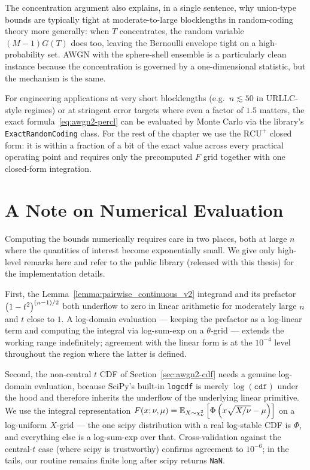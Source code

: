 The concentration argument also explains, in a single sentence, why union-type bounds are typically tight at moderate-to-large blocklengths in random-coding theory more generally: when $T$ concentrates, the random variable $(M-1) G(T)$ does too, leaving the Bernoulli envelope tight on a high-probability set.  AWGN with the sphere-shell ensemble is a particularly clean instance because the concentration is governed by a one-dimensional statistic, but the mechanism is the same.

For engineering applications at very short blocklengths (e.g.\ $n \lesssim 50$ in URLLC-style regimes) or at stringent error targets where even a factor of $1.5$ matters, the exact formula~\eqref{eq:awgn2-percl} can be evaluated by Monte Carlo via the library's \texttt{ExactRandomCoding} class.  For the rest of the chapter we use the $\mathrm{RCU}^+$ closed form: it is within a fraction of a bit of the exact value across every practical operating point and requires only the precomputed $F$ grid together with one closed-form integration.

\section{A Note on Numerical Evaluation}
\label{sec:awgn2-numerics}

Computing the bounds numerically requires care in two places, both at large $n$ where the quantities of interest become exponentially small.  We give only high-level remarks here and refer to the public library (released with this thesis) for the implementation details.

First, the Lemma~\ref{lemma:pairwise_continuous_v2} integrand and its prefactor $\left( 1-t^2 \right)^{(n-1)/2}$ both underflow to zero in linear arithmetic for moderately large $n$ and $t$ close to $1$.  A log-domain evaluation --- keeping the prefactor as a log-linear term and computing the integral via log-sum-exp on a $\theta$-grid --- extends the working range indefinitely; agreement with the linear form is at the $10^{-4}$ level throughout the region where the latter is defined.

Second, the non-central $t$ CDF of Section~\ref{sec:awgn2-cdf} needs a genuine log-domain evaluation, because SciPy's built-in \texttt{logcdf} is merely $\log(\texttt{cdf})$ under the hood and therefore inherits the underflow of the underlying linear primitive.  We use the integral representation $F(x; \nu, \mu) = \mathbb{E}_{X\sim\chi^2_\nu} \left[ \Phi\left( x\sqrt{X/\nu} - \mu \right) \right]$ on a log-uniform $X$-grid --- the one scipy distribution with a real log-stable CDF is $\Phi$, and everything else is a log-sum-exp over that.  Cross-validation against the central-$t$ case (where scipy is trustworthy) confirms agreement to $10^{-6}$; in the tails, our routine remains finite long after scipy returns \texttt{NaN}.

